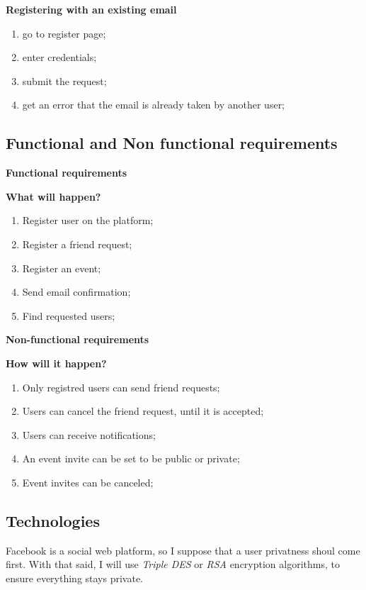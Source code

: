 \documentclass{article}
\begin{document}
				\textbf{Registering with an existing email}
				\begin{enumerate}
					\item go to register page;
					\item enter credentials;
					\item submit the request;
					\item get an error that the email is already taken by another user;
				\end{enumerate}


		\subsection{Functional and Non functional requirements}
			\begin{center}
				\textbf{Functional requirements}
			\end{center}

				\textbf{What will happen?}
				\begin{enumerate}
					\item Register user on the platform;
					\item Register a friend request;
					\item Register an event;
					\item Send email confirmation;
					\item Find requested users;
				\end{enumerate}

			\begin{center}
				\textbf{Non-functional requirements}
			\end{center}

				\textbf{How will it happen?}
				\begin{enumerate}
					\item Only registred users can send friend requests;
					\item Users can cancel the friend request, until it is accepted;
					\item Users can receive notifications;
					\item An event invite can be set to be public or private;
					\item Event invites can be canceled;
				\end{enumerate}

		\subsection{Technologies}
			Facebook is a social web platform, so I suppose that a user privatness shoul come first. With that said, I will use \textit{Triple DES} or \textit{RSA} encryption algorithms, to ensure everything stays private.
		
\end{document}
